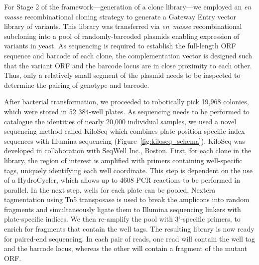 For Stage 2 of the framework---generation of a clone library---we employed an \textit{en masse} recombinational cloning strategy to generate a Gateway Entry vector library of  variants. This library was transferred via \textit{en~masse} recombinational subcloning into a pool of randomly-barcoded plasmids enabling expression of  variants in yeast. As sequencing is required to establish the full-length ORF sequence and barcode of each clone, the complementation vector is designed such that the variant ORF and the barcode locus are in close proximity to each other. Thus, only a relatively small segment of the plasmid needs to be inspected to determine the pairing of genotype and barcode. 

After bacterial transformation, we proceeded to robotically pick 19,968 colonies, which were stored in 52 384-well plates. As sequencing needs to be performed to catalogue the identities of nearly 20,000 individual samples, we used a novel sequencing method called KiloSeq which combines plate-position-specific index sequences with Illumina sequencing (Figure~\ref{fig:kiloseq_schema}).
KiloSeq was developed in collaboration with SeqWell Inc., Boston. First, for each clone in the library, the region of interest is amplified with primers containing well-specific tags, uniquely identifying each well coordinate. This step is dependent on the use of a HydroCycler, which allows up to 4608 PCR reactions to be performed in parallel. In the next step, wells for each plate can be pooled. Nextera tagmentation using Tn5 transposase is used to break the amplicons into random fragments and simultaneously ligate them to Illumina sequencing linkers with plate-specific indices. We then re-amplify the pool with  3'-specific primers, to enrich for fragments that contain the well tags. The resulting library is now ready for paired-end sequencing. In each pair of reads, one read will contain the well tag and the barcode locus, whereas the other will contain a fragment of the mutant ORF.

